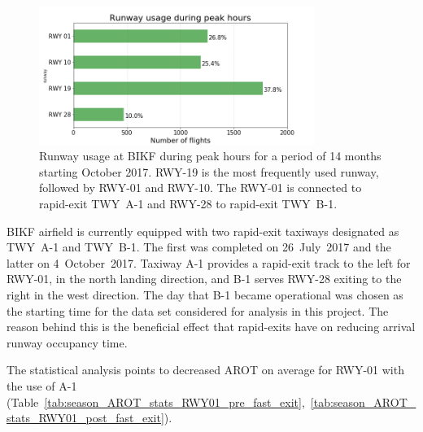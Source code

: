 \begin{figure}[h]
    \centering
    \includegraphics[width=0.8\textwidth]{graphics/fig_runway_usage_peak.png}
    \caption[Runway usage at BIKF during peak hours]{Runway usage at BIKF during peak hours for a period of 14 months starting October 2017. RWY-19 is the most frequently used runway, followed by RWY-01 and RWY-10. The RWY-01 is connected to rapid-exit TWY~A-1 and RWY-28 to rapid-exit TWY~B-1.}
    \label{fig:runway_usage_peak}
\end{figure}

BIKF airfield is currently equipped with two rapid-exit taxiways designated as TWY~A-1 and TWY~B-1. The first was completed on 26~July~2017 and the latter on 4~October~2017. Taxiway A-1 provides a rapid-exit track to the left for RWY-01, in the north landing direction, and B-1 serves RWY-28 exiting to the right in the west direction. The day that B-1 became operational was chosen as the starting time for the data set considered for analysis in this project. The reason behind this is the beneficial effect that rapid-exits have on reducing arrival runway occupancy time. 

The statistical analysis points to decreased AROT on average for RWY-01 with the use of A-1 (Table~\ref{tab:season_AROT_stats_RWY01_pre_fast_exit},~\ref{tab:season_AROT_stats_RWY01_post_fast_exit}). 

